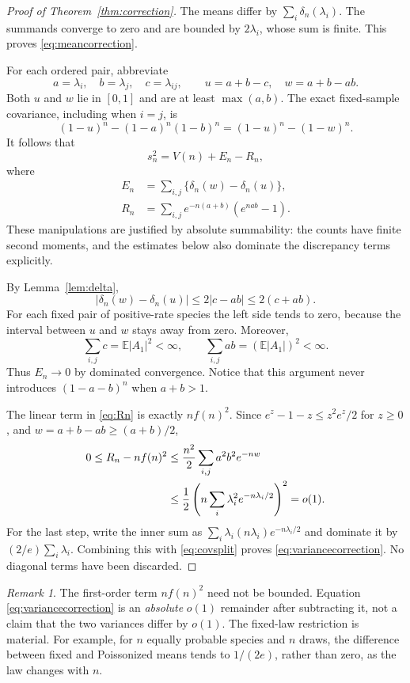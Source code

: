 \documentclass[11pt]{article}
\numberwithin{equation}{section}
\theoremstyle{definition}
\theoremstyle{remark}
\newtheorem{remark}[theorem]{Remark}
\newcommand{\E}{\mathbb E}
\begin{document}
\begin{proof}[Proof of Theorem~\ref{thm:correction}]
The means differ by $\sum_i\delta_n(\lambda_i)$. The summands converge to zero
and are bounded by $2\lambda_i$, whose sum is finite. This proves
\eqref{eq:meancorrection}.

For each ordered pair, abbreviate
\[
 a=\lambda_i,\quad b=\lambda_j,\quad c=\lambda_{ij},\qquad
 u=a+b-c,\quad w=a+b-ab.
\]
Both $u$ and $w$ lie in $[0,1]$ and are at least $\max(a,b)$.
The exact fixed-sample covariance, including when $i=j$, is
\[
 (1-u)^n-(1-a)^n(1-b)^n=(1-u)^n-(1-w)^n.
\]
It follows that
\begin{equation}\label{eq:covsplit}
 s_n^2=V(n)+E_n-R_n,
\end{equation}
where
\begin{align}
 E_n&=\sum_{i,j}\{\delta_n(w)-\delta_n(u)\},\label{eq:En}\\
 R_n&=\sum_{i,j}e^{-n(a+b)}(e^{nab}-1).\label{eq:Rn}
\end{align}
These manipulations are justified by absolute summability: the counts have
finite second moments, and the estimates below also dominate the discrepancy
terms explicitly.

By Lemma~\ref{lem:delta},
\[
 |\delta_n(w)-\delta_n(u)|\le2|c-ab|\le2(c+ab).
\]
For each fixed pair of positive-rate species the left side tends to zero,
because the interval between $u$ and $w$ stays away from zero. Moreover,
\[
 \sum_{i,j}c=\E|A_1|^2<\infty,
 \qquad \sum_{i,j}ab=(\E|A_1|)^2<\infty.
\]
Thus $E_n\to0$ by dominated convergence. Notice that this argument never
introduces $(1-a-b)^n$ when $a+b>1$.

The linear term in \eqref{eq:Rn} is exactly $nf(n)^2$.
Since $e^z-1-z\le z^2e^z/2$ for $z\ge0$, and
$w=a+b-ab\ge(a+b)/2$,
\begin{align}
 0\le R_n-nf(n)^2
 &\le\frac{n^2}{2}\sum_{i,j}a^2b^2e^{-nw}\notag\\
 &\le\frac12\left(n\sum_i\lambda_i^2e^{-n\lambda_i/2}\right)^2=o(1).
 \label{eq:Rremainder}
\end{align}
For the last step, write the inner sum as
$\sum_i\lambda_i(n\lambda_i)e^{-n\lambda_i/2}$ and dominate it by
$(2/e)\sum_i\lambda_i$. Combining this with \eqref{eq:covsplit} proves
\eqref{eq:variancecorrection}. No diagonal terms have been discarded.
\end{proof}

\begin{remark}
The first-order term $nf(n)^2$ need not be bounded. Equation
\eqref{eq:variancecorrection} is an \emph{absolute} $o(1)$ remainder after
subtracting it, not a claim that the two variances differ by $o(1)$.
The fixed-law restriction is material. For example, for $n$ equally probable
species and $n$ draws, the difference between fixed and Poissonized means
tends to $1/(2e)$, rather than zero, as the law changes with $n$.
\end{remark}
\end{document}
